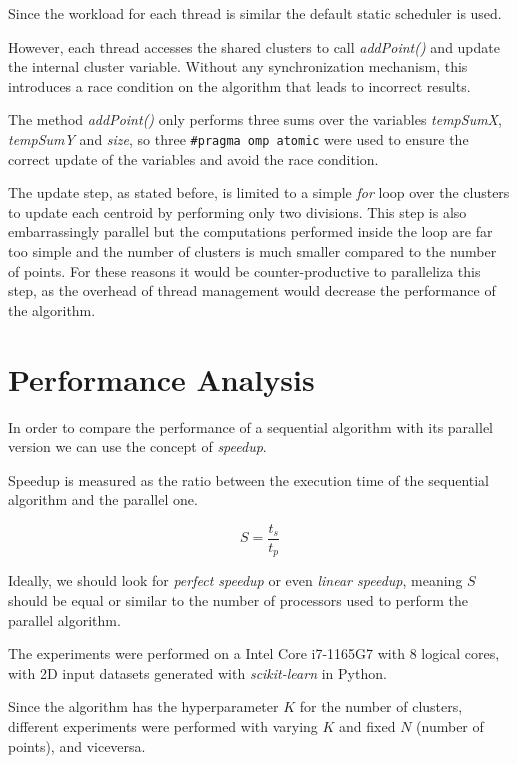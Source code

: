 \documentclass[10pt,twocolumn,letterpaper]{article}
\begin{document}
Since the workload for each thread is similar the default static scheduler is used.

However, each thread accesses the shared clusters to call \textit{addPoint()} and update the internal cluster variable. Without any synchronization mechanism, this introduces a race condition on the algorithm that leads to incorrect results.

The method \textit{addPoint()} only performs three sums over the variables \textit{tempSumX}, \textit{tempSumY} and \textit{size}, so three \verb"#pragma omp atomic" were used to ensure the correct update of the variables and avoid the race condition.

The update step, as stated before, is limited to a simple \textit{for} loop over the clusters to update each centroid by performing only two divisions. This step is also embarrassingly parallel but the computations performed inside the loop are far too simple and the number of clusters is much smaller compared to the number of points. For these reasons it would be counter-productive to paralleliza this step, as the overhead of thread management would decrease the performance of the algorithm.

\section{Performance Analysis}
In order to compare the performance of a sequential algorithm with its parallel version we can use the concept of \textit{speedup}.

Speedup is measured as the ratio between the execution time of the sequential algorithm and the parallel one.

\[S = \frac{t_s}{t_p}\]

Ideally, we should look for \textit{perfect speedup} or even \textit{linear speedup}, meaning $S$ should be equal or similar to the number of processors used to perform the parallel algorithm.

The experiments were performed on a Intel Core i7-1165G7 with 8 logical cores, with 2D input datasets generated with \textit{scikit-learn} in Python.

Since the algorithm has the hyperparameter $K$ for the number of clusters, different experiments were performed with varying $K$ and fixed $N$ (number of points), and viceversa.
\end{document}
